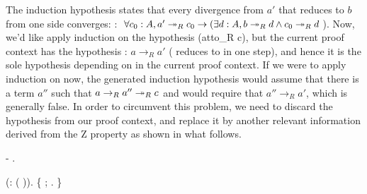         The induction hypothesis states that every divergence from
        $a'$ that reduces to $b$ from one side converges: 
        : $\forall c_0 : A, a'\twoheadrightarrow_R c_0 \to (\exists d : A, b\twoheadrightarrow_R d
        \land c_0\twoheadrightarrow_R d$). Now, we'd like apply induction on the
        hypothesis  (atto\_R c), but the current proof context has the
        hypothesis : $a\to_R a'$ ( reduces to  in one step),
        and hence it is the sole hypothesis depending on  in the
        current proof context. If we were to apply induction on  now, 
        the generated induction hypothesis  would assume that there is 
        a term $a''$ such that $a \to_R a'' \twoheadrightarrow_R c$ and would require that 
        $a'' \to_R a'$, which is generally false. In order to circumvent 
        this problem, we need to discard the hypothesis  from our proof 
        context, and replace it by another relevant information derived from 
        the Z property as shown in what follows. 
\begin{coqdoccode}
\coqdocemptyline
\coqdocindent{1.00em}
-   . \end{coqdoccode}
\begin{coqdoccode}
\coqdocemptyline
\coqdocindent{2.00em}
 (:    ( )).\coqdoceol
\coqdocindent{2.00em}
\{  ; . \} \end{coqdoccode}
